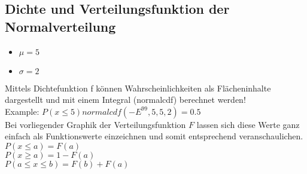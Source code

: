 \subsection{Dichte und Verteilungsfunktion der Normalverteilung}

\begin{itemize}
    \item $\mu = 5$
    \item $\sigma = 2$
\end{itemize}

Mittels Dichtefunktion f können Wahrscheinlichkeiten als Flächeninhalte dargestellt und mit einem Integral (normalcdf) berechnet werden!\\
Example: $P(x \leq 5) normalcdf(-E^{99},5,5,2)=0.5$\\

Bei vorliegender Graphik der Verteilungsfunktion $F$ lassen sich diese Werte ganz einfach als Funktionswerte einzeichnen und somit entsprechend veranschaulichen.\\
$P(x \leq a) = F(a)$\\
$P(x \geq a) = 1-F(a)$\\
$P(a \leq x\leq b) = F(b)+F(a)$\\